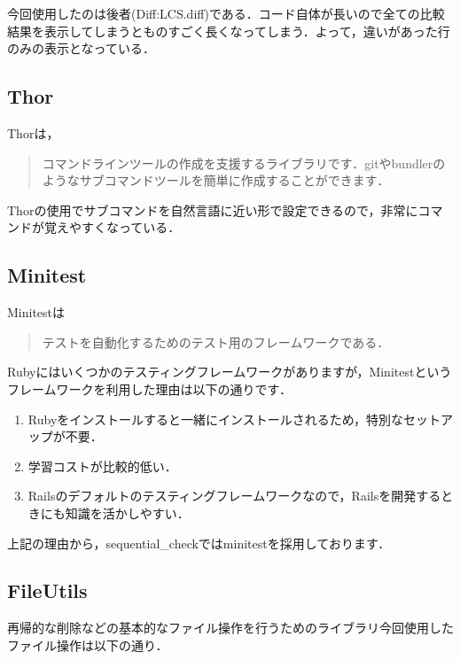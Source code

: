 今回使用したのは後者(Diff:LCS.diff)である．コード自体が長いので全ての比較結果を表示してしまうとものすごく長くなってしまう．よって，違いがあった行のみの表示となっている．

    \subsection{Thor}\label{thor}

    Thorは，
\begin{quotation}
コマンドラインツールの作成を支援するライブラリです．gitやbundlerのようなサブコマンドツールを簡単に作成することができます． \cite{thor}
\end{quotation}
Thorの使用でサブコマンドを自然言語に近い形で設定できるので，非常にコマンドが覚えやすくなっている．

    \subsection{Minitest}\label{minitest}

    Minitestは
\begin{quotation} 
テストを自動化するためのテスト用のフレームワークである．\cite{rails}
\end{quotation}
Rubyにはいくつかのテスティングフレームワークがありますが，Minitestというフレームワークを利用した理由は以下の通りです．

\begin{enumerate}
\def\labelenumi{\arabic{enumi}.}
\tightlist
\item
  Rubyをインストールすると一緒にインストールされるため，特別なセットアップが不要．
\item
  学習コストが比較的低い．
\item
  Railsのデフォルトのテスティングフレームワークなので，Railsを開発するときにも知識を活かしやすい．
\end{enumerate}

上記の理由から，sequential\_checkではminitestを採用しております．

    \subsection{FileUtils}\label{fileutils}

    再帰的な削除などの基本的なファイル操作を行うためのライブラリ今回使用したファイル操作は以下の通り．

